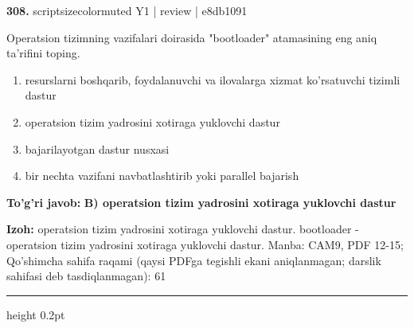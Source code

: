 \documentclass[10pt,a4paper]{article}
\begin{document}
{\bfseries\sffamily\color{ink} 308.} {scriptsizecolor{muted} Y1 | review | e8db1091}
\par
Operatsion tizimning vazifalari doirasida "bootloader" atamasining eng aniq ta'rifini toping.
\begin{enumerate}[label=\Alph*),leftmargin=9mm]
\item resurslarni boshqarib, foydalanuvchi va ilovalarga xizmat ko'rsatuvchi tizimli dastur
\item operatsion tizim yadrosini xotiraga yuklovchi dastur
\item bajarilayotgan dastur nusxasi
\item bir nechta vazifani navbatlashtirib yoki parallel bajarish
\end{enumerate}
\begin{tcolorbox}[enhanced,breakable,colback=teal!4,colframe=teal!60!black,boxrule=0.45pt,arc=1.2mm,left=2.7mm,right=2.7mm,top=1.8mm,bottom=1.8mm,before skip=2mm,after skip=2mm]
{\bfseries\sffamily\color{teal}To'g'ri javob:} \textbf{B) operatsion tizim yadrosini xotiraga yuklovchi dastur}
\par\smallskip
{\bfseries Izoh:} operatsion tizim yadrosini xotiraga yuklovchi dastur. bootloader - operatsion tizim yadrosini xotiraga yuklovchi dastur. Manba: CAM9, PDF 12-15; Qo'shimcha sahifa raqami (qaysi PDFga tegishli ekani aniqlanmagan; darslik sahifasi deb tasdiqlanmagan): 61
\end{tcolorbox}
\vspace{2mm}\hrule height 0.2pt\vspace{3mm}
\end{document}
